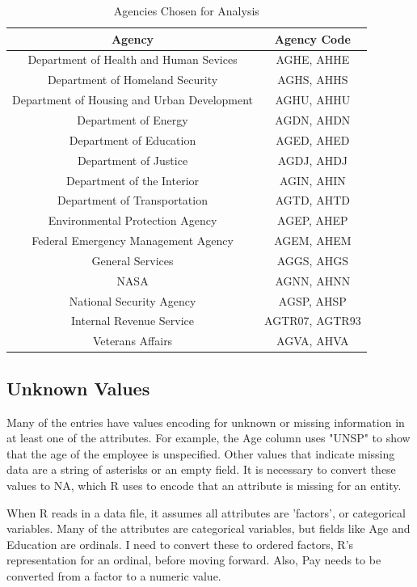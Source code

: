 \documentclass{article}
\begin{document}
        \begin{center}
            \begin{table}
                \centering
                \begin{tabular}{ |c|c| }
                    \hline
                    Agency & Agency Code \\
                    \hline
                    Department of Health and Human Sevices & AGHE, AHHE \\
                    Department of Homeland Security & AGHS, AHHS \\
                    Department of Housing and Urban Development & AGHU, AHHU \\
                    Department of Energy & AGDN, AHDN \\
                    Department of Education & AGED, AHED \\
                    Department of Justice & AGDJ, AHDJ \\
                    Department of the Interior & AGIN, AHIN \\
                    Department of Transportation & AGTD, AHTD \\
                    Environmental Protection Agency & AGEP, AHEP \\
                    Federal Emergency Management Agency & AGEM, AHEM \\
                    General Services & AGGS, AHGS \\
                    NASA & AGNN, AHNN \\
                    National Security Agency & AGSP, AHSP \\
                    Internal Revenue Service & AGTR07, AGTR93 \\
                    Veterans Affairs & AGVA, AHVA \\
                    \hline
                \end{tabular}
                \caption{Agencies Chosen for Analysis}
                \label{tab:5}
            \end{table}
        \end{center}

    \subsection{Unknown Values}
    Many of the entries have values encoding for unknown or missing information in at least one of the attributes. For example, the Age column uses "UNSP" to show that the age of the employee is unspecified. Other values that indicate missing data are a string of asterisks or an empty field. It is necessary to convert these values to NA, which R uses to encode that an attribute is missing for an entity.
    \par
    When R reads in a data file, it assumes all attributes are 'factors', or categorical variables. Many of the attributes are categorical variables, but fields like Age and Education are ordinals. I need to convert these to ordered factors, R's representation for an ordinal, before moving forward. Also, Pay needs to be converted from a factor to a numeric value.
\end{document}
